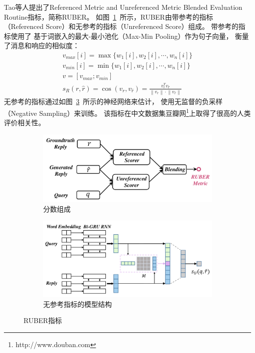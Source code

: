 Tao等人提出了Referenced Metric and Unreferenced Metric Blended Evaluation Routine指标，简称RUBER。
如图~\ref{fig:RUBER_components}~所示，RUBER由带参考的指标（Referenced Score）和无参考的指标（Unreferenced Score）组成。
带参考的指标使用了
基于词嵌入的最大-最小池化（Max-Min Pooling）作为句子向量，
衡量了消息和响应的相似度：
\begin{align}
    v_{max}[i] = \max \{ w_1[i], w_2[i], \cdots, w_n[i] \} \\
    v_{min}[i] = \min \{ w_1[i], w_2[i], \cdots, w_n[i] \} \\
    v = [v_{max}; v_{min}] \\
    s_R(r, \hat{r}) = \cos(v_r, v_{\hat{r}}) = \frac{v_r^T v_{\hat{r}}}{\left\| v_r \right\| \cdot \left\| v_{\hat{r}} \right\|}
\end{align}
无参考的指标通过如图~\ref{fig:RUBER_unref_model}~所示的神经网络来估计，
使用无监督的负采样（Negative Sampling）来训练。
该指标在中文数据集豆瓣网\footnote{http://www.douban.com}上取得了很高的人类评价相关性。
\begin{figure}[H]
    \begin{subfigure}{0.5\linewidth}
        \centering
        \includegraphics[width=\linewidth]{figure/RUBER_overview.png}
        \caption{分数组成}
        \label{fig:RUBER_components}
    \end{subfigure}%
    \begin{subfigure}{0.5\linewidth}
        \centering
        \includegraphics[width=\linewidth]{figure/RUBER_model.png}
        \caption{无参考指标的模型结构}
        \label{fig:RUBER_unref_model}
    \end{subfigure}
    \caption{RUBER指标}
\end{figure}

